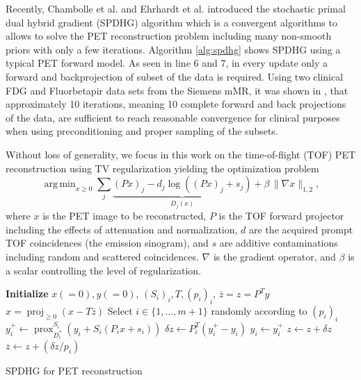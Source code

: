\documentclass[11pt,twocolumn,twoside]{article}
\DeclareMathOperator{\proj}{proj}
\DeclareMathOperator{\prox}{prox}
\DeclareMathOperator*{\argmin}{arg\,min}
\begin{document}
Recently, Chambolle et al. \cite{Chambolle2018} and  Ehrhardt et al. \cite{Ehrhardt2019} introduced 
the stochastic primal dual hybrid gradient (SPDHG) algorithm which is a convergent algorithms
to allows to solve the PET reconstruction problem including many non-smooth priors with
only a few iterations. 
Algorithm \ref{alg:spdhg} shows SPDHG using a typical PET forward model.
As seen in line 6 and 7, in every update only a forward and backprojection of subset
of the data is required.
Using two clinical FDG and Fluorbetapir data sets from the Siemens mMR, 
it was shown in \cite{Ehrhardt2019}, that approximately 10 iterations, meaning 10 complete 
forward and back projections of the data, are sufficient to reach reasonable convergence
for clinical purposes when using preconditioning and proper sampling of the subsets.

Without loss of generality, we focus in this work on the time-of-flight (TOF) PET reconstruction 
using TV regularization yielding the optimization problem
%
\begin{equation}
\argmin _{x\geq 0} \sum_j \underbrace{(Px)_j -  d_j \log \left( (Px)_ j + s_j \right)}_{D_j(x)} + \beta \, \|\nabla x\|_{1,2},
\end{equation}
%
where $x$ is the PET image to be reconstructed, $P$ is the TOF forward projector including the effects
of attenuation and normalization, $d$ are the acquired prompt TOF coincidences (the emission sinogram),
and $s$ are additive contaminations including random and scattered coincidences. $\nabla$ is the gradient
operator, and $\beta$ is a scalar controlling the level of regularization.

\begin{algorithm}[t]
\begin{algorithmic}[1]
\State \textbf{Initialize} $x(=0),y(=0)$, $(S_i)_i,T,(p_i)_i$,
\State $\overline{z} = z = P^T y$
\Repeat
	\State $x = \proj_{\geq 0} (x - T \overline{z})$
	\State Select $i \in \{ 1,\ldots,m+1\} $ randomly according to $(p_i)_i$
	\State \quad $y_i^+ \gets \prox_{D_i^*}^{S_i} ( y_i + S_i  ( P_i x + s_i))$
	\State \quad $\delta z \gets P_i^T (y_i^+ - y_i)$
	\State \quad $y_i \gets y_i^+$
	\State $z \gets z + \delta z$
	\State $\overline{z} \gets  z + (\delta z/p_i)$
\State {}
\end{algorithmic}
\caption{SPDHG for PET reconstruction \cite{Ehrhardt2019}}
\label{alg:spdhg}
\end{algorithm}
\end{document}
